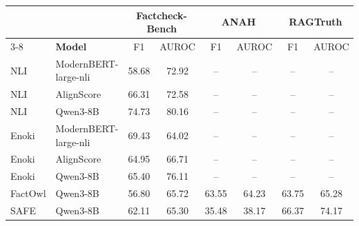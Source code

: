 \begin{table}[htb!]
\small
\begin{tabular}{@{}llcccccc@{}}
\toprule
                                  &                                  & \multicolumn{2}{c}{\textbf{Factcheck-Bench}} & \multicolumn{2}{c}{\textbf{ANAH}} & \multicolumn{2}{c}{\textbf{RAGTruth}} \\ \cmidrule(l){3-8}
\multirow{-2}{*}{\textbf{Method}} & \multirow{-2}{*}{\textbf{Model}} & F1                    & AUROC                & F1             & AUROC            & F1              & AUROC               \\ \midrule
\rowcolor[HTML]{EFEFEF}
NLI                               & ModernBERT-large-nli             & 58.68                 & 72.92                & --             & --               & --              & --                  \\
\rowcolor[HTML]{EFEFEF}
NLI                               & AlignScore                       & 66.31                 & 72.58                & --             & --               & --              & --                  \\
\rowcolor[HTML]{EFEFEF}
NLI                               & Qwen3-8B                         & 74.73                 & 80.16                & --             & --               & --              & --                  \\ \midrule
Enoki                             & ModernBERT-large-nli             & 69.43                 & 64.02                & --             & --               & --              & --                  \\
Enoki                             & AlignScore                       & 64.95                 & 66.71                & --             & --               & --              & --                  \\
Enoki                             & Qwen3-8B                         & 65.40                 & 76.11                & --             & --               & --              & --                  \\ \midrule
FactOwl                           & Qwen3-8B                         & 56.80                 & 65.72                & 63.55          & 64.23            & 63.75           & 65.28               \\
SAFE                              & Qwen3-8B                         & 62.11                 & 65.30                & 35.48          & 38.17            & 66.37           & 74.17               \\

\end{tabular}
\end{table}
